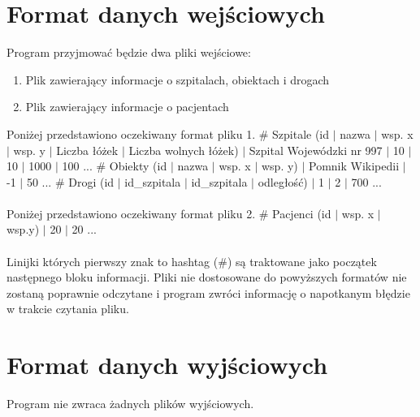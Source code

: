 \documentclass[a4paper,12pt,twoside]{article}
\begin{document}
\section{Format danych wejściowych}
Program przyjmować będzie dwa pliki wejściowe:
\begin{enumerate}
	\item Plik zawierający informacje o szpitalach, obiektach i drogach
	\item Plik zawierający informacje o pacjentach
\end{enumerate}
Poniżej przedstawiono oczekiwany format pliku 1.\newline
\# Szpitale (id $|$ nazwa $|$ wsp. x $|$ wsp. y $|$ Liczba łóżek $|$ Liczba wolnych łóżek) $|$ Szpital Wojewódzki nr 997 $|$ 10 $|$ 10 $|$ 1000 $|$ 100\newline
...\newline
\# Obiekty (id $|$ nazwa $|$ wsp. x $|$ wsp. y) $|$ Pomnik Wikipedii $|$ -1 $|$ 50\newline
...\newline
\# Drogi (id $|$ id\_szpitala $|$ id\_szpitala $|$ odległość) $|$ 1 $|$ 2 $|$ 700\newline
...

\paragraph{}
Poniżej przedstawiono oczekiwany format pliku 2.\newline
\# Pacjenci (id $|$ wsp. x $|$ wsp.y) $|$ 20 $|$ 20\newline
...\newline

\paragraph{}
Linijki których pierwszy znak to hashtag (\#) są traktowane jako początek następnego bloku informacji. Pliki nie dostosowane do powyższych formatów nie zostaną poprawnie odczytane i program zwróci informację o napotkanym błędzie w trakcie czytania pliku.

\section{Format danych wyjściowych}
Program nie zwraca żadnych plików wyjściowych.
\end{document}

